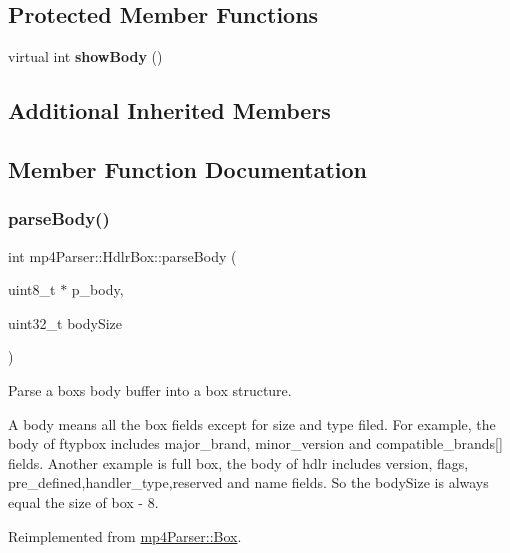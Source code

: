\subsection*{Protected Member Functions}
\begin{DoxyCompactItemize}
\item 
\mbox{\label{classmp4_parser_1_1_hdlr_box_a2fd551eb7e4127acef508eced45807ce}} 
virtual int {\bfseries show\+Body} ()
\end{DoxyCompactItemize}
\subsection*{Additional Inherited Members}


\subsection{Member Function Documentation}
\mbox{\label{classmp4_parser_1_1_hdlr_box_a2bd53771c96860d30067c665f2a7a07a}} 
\subsubsection{\texorpdfstring{parseBody()}{parseBody()}}
{\footnotesize\ttfamily int mp4\+Parser\+::\+Hdlr\+Box\+::parse\+Body (\begin{DoxyParamCaption}\item[{uint8\+\_\+t $\ast$}]{p\+\_\+body,  }\item[{uint32\+\_\+t}]{body\+Size }\end{DoxyParamCaption})\hspace{0.3cm}{\ttfamily [virtual]}}



Parse a box\textquotesingle{}s body buffer into a box structure. 

A body means all the box fields except for size and type filed. For example, the body of ftypbox includes major\+\_\+brand, minor\+\_\+version and compatible\+\_\+brands\mbox{[}\mbox{]} fields. Another example is full box, the body of hdlr includes version, flags, pre\+\_\+defined,handler\+\_\+type,reserved and name fields. So the body\+Size is always equal the size of box -\/ 8. 

Reimplemented from \mbox{\hyperlink{classmp4_parser_1_1_box_a3dd0c084ac65bc77b69ac5ecaf796cb2}{mp4\+Parser\+::\+Box}}.



